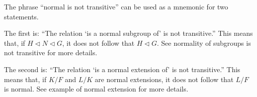 \documentclass[12pt]{article}
\begin{document}
The phrase ``normal is not transitive'' can be used as a mnemonic for two statements.

The first is: ``The relation `is a normal subgroup of' is not transitive.''  This means that, if $H \triangleleft N \triangleleft G$, it does not follow that $H \triangleleft G$.  See normality of subgroups is not transitive for more details.

The second is: ``The relation `is a normal extension of' is not transitive.''  This means that, if $K/F$ and $L/K$ are normal extensions, it does not follow that $L/F$ is normal.  See example of normal extension for more details.
\end{document}

